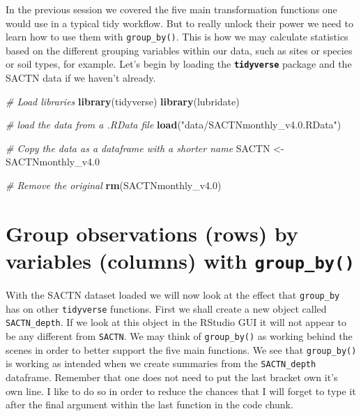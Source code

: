 \documentclass[]{book}
\newenvironment{Shaded}{\begin{snugshade}}{\end{snugshade}}
\newcommand{\KeywordTok}[1]{\textcolor[rgb]{0.13,0.29,0.53}{\textbf{#1}}}
\newcommand{\DecValTok}[1]{\textcolor[rgb]{0.00,0.00,0.81}{#1}}
\newcommand{\StringTok}[1]{\textcolor[rgb]{0.31,0.60,0.02}{#1}}
\newcommand{\CommentTok}[1]{\textcolor[rgb]{0.56,0.35,0.01}{\textit{#1}}}
\newcommand{\NormalTok}[1]{#1}
\theoremstyle{definition}
\theoremstyle{definition}
\theoremstyle{definition}
\theoremstyle{remark}
\begin{document}
In the previous session we covered the five main transformation
functions one would use in a typical tidy workflow. But to really unlock
their power we need to learn how to use them with \texttt{group\_by()}.
This is how we may calculate statistics based on the different grouping
variables within our data, such as sites or species or soil types, for
example. Let's begin by loading the \textbf{\texttt{tidyverse}} package
and the SACTN data if we haven't already.

\begin{Shaded}
\begin{Highlighting}[]
\CommentTok{# Load libraries}
\KeywordTok{library}\NormalTok{(tidyverse)}
\KeywordTok{library}\NormalTok{(lubridate)}

\CommentTok{# load the data from a .RData file}
\KeywordTok{load}\NormalTok{(}\StringTok{"data/SACTNmonthly_v4.0.RData"}\NormalTok{)}

\CommentTok{# Copy the data as a dataframe with a shorter name}
\NormalTok{SACTN <-}\StringTok{ }\NormalTok{SACTNmonthly_v4.}\DecValTok{0}

\CommentTok{# Remove the original}
\KeywordTok{rm}\NormalTok{(SACTNmonthly_v4.}\DecValTok{0}\NormalTok{)}
\end{Highlighting}
\end{Shaded}

\section{\texorpdfstring{Group observations (rows) by variables
(columns) with
\texttt{group\_by()}}{Group observations (rows) by variables (columns) with group\_by()}}\label{group-observations-rows-by-variables-columns-with-group_by}

With the SACTN dataset loaded we will now look at the effect that
\texttt{group\_by} has on other \texttt{tidyverse} functions. First we
shall create a new object called \texttt{SACTN\_depth}. If we look at
this object in the RStudio GUI it will not appear to be any different
from \texttt{SACTN}. We may think of \texttt{group\_by()} as working
behind the scenes in order to better support the five main functions. We
see that \texttt{group\_by()} is working as intended when we create
summaries from the \texttt{SACTN\_depth} dataframe. Remember that one
does not need to put the last bracket own it's own line. I like to do so
in order to reduce the chances that I will forget to type it after the
final argument within the last function in the code chunk.
\end{document}
